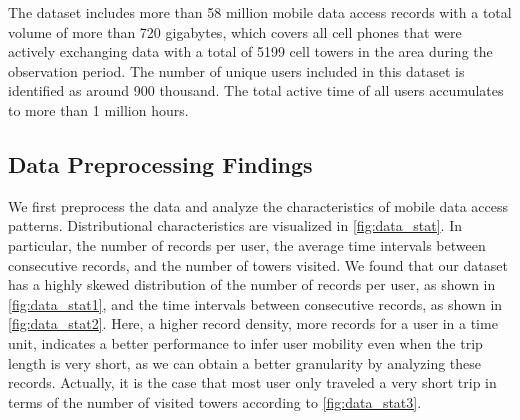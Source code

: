 The dataset includes more than 58 million mobile data access records with a total volume of more than 720 gigabytes, which covers all cell phones that were actively exchanging data with a total of 5199 cell towers in the area during the observation period. 
The number of unique users included in this dataset is identified as around 900 thousand. %
The total active time of all users accumulates to more than 1 million hours. 

\subsection{Data Preprocessing Findings}

We first preprocess the data and analyze the characteristics of mobile data access patterns.  %
Distributional characteristics are visualized in \autoref{fig:data_stat}.
In particular,
the number of records per user,
the average time intervals between consecutive records, and
the number of towers visited.
We found that our dataset has a highly skewed distribution of
the number of records per user, as shown in \autoref{fig:data_stat1}, and
the time intervals between consecutive records, as shown in \autoref{fig:data_stat2}.
Here, a higher record density, \ie more records for a user in a time unit, indicates a better performance to infer user mobility even when the trip length is very short,
as we can obtain a better granularity by analyzing these records.
Actually, it is the case that most user only traveled a very short trip in terms of the number of visited towers according to \autoref{fig:data_stat3}.

